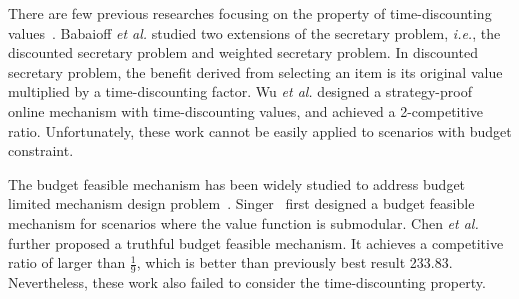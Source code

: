 \documentclass[10pt,journal,letterpaper,compsoc]{IEEEtran}
\newcommand{\ie}{{\em i.e.}}
\newcommand{\et}{{\em et al. }}
\begin{document}
There are few previous researches focusing on the property of time-discounting values~\cite{Frazier:2014:IE:2600057.2602897,Olariu:2014:AIA:2581555.2581569,Fujita:2014:ASA:2615731.2616036}. Babaioff \et\cite{babaioff2009secretary} studied two extensions of the secretary problem, \ie, the discounted secretary problem and weighted secretary problem. In discounted secretary problem, the benefit derived from selecting an item is its original value multiplied by a time-discounting factor. Wu \et\cite{wu2014strategy} designed a strategy-proof online mechanism with time-discounting values, and achieved a 2-competitive ratio. Unfortunately, these work cannot be easily applied to scenarios with budget constraint. 

The budget feasible mechanism has been widely studied to address budget limited mechanism design problem~\cite{Zhao:2016:BOI:3001647.3001648,Balkanski:2015:MFA:2764468.2764505,Chan:2016:BFM:2936924.2936945,Goel:2014:CAB:2600057.2602851,Lee:2016:MRV:2940716.2940745,Lu:2015:IEG:2764468.2764500,Goel:2015:PCA:2799630.2757277}. Singer~\cite{singer2010budget} first designed a budget feasible mechanism for scenarios where the value function is submodular. Chen \et\cite{chen2011approximability} further proposed a truthful budget feasible mechanism. It achieves a competitive ratio of larger than $\frac{1}{9}$, which is better than previously best result 233.83. Nevertheless, these work also failed to consider the time-discounting property.
\end{document}
